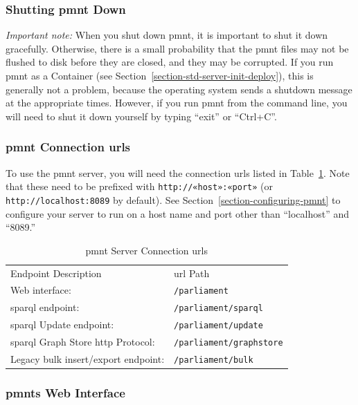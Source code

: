 \subsubsection{Shutting \ac{pmnt} Down}

\emph{Important note:}  When you shut down \ac{pmnt}, it is important to shut it down gracefully.  Otherwise, there is a small probability that the \ac{pmnt} files may not be flushed to disk before they are closed, and they may be corrupted.  If you run \ac{pmnt} as a Container (see Section~\ref{section-std-server-init-deploy}), this is generally not a problem, because the operating system sends a shutdown message at the appropriate times.  However, if you run \ac{pmnt} from the command line, you will need to shut it down yourself by typing ``exit'' or ``Ctrl+C''.

\subsubsection{\ac{pmnt} Connection \acp{url}}

To use the \ac{pmnt} server, you will need the connection \acp{url} listed in Table~\ref{table-pmnt-connect-urls}. Note that these need to be prefixed with \nolinkurl{http://«host»:«port»} (or \nolinkurl{http://localhost:8089} by default).  See Section~\ref{section-configuring-pmnt} to configure your server to run on a host name and port other than ``localhost'' and ``8089.''
\begin{table}[htbp]
	\centering\small
	\begin{tabular}{ll}
		\toprule
		Endpoint Description & \ac{url} Path\\
		\headingrule
		Web interface: & \nolinkurl{/parliament}\\
		\ac{sparql} endpoint: & \nolinkurl{/parliament/sparql}\\
		\ac{sparql} Update endpoint: & \nolinkurl{/parliament/update}\\
		\ac{sparql} Graph Store \acs*{http} Protocol: & \nolinkurl{/parliament/graphstore}\\
		Legacy bulk insert/export endpoint: & \nolinkurl{/parliament/bulk}\\
		\bottomrule
	\end{tabular}
	\caption{\acs*{pmnt} Server Connection \acsp*{url}}
	\label{table-pmnt-connect-urls}
\end{table}

\subsubsection{\acp{pmnt} Web Interface}


